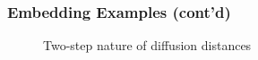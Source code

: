 \documentclass[professionalfonts,hyperref={pdfpagelabels=false,colorlinks=true,linkcolor=red}]{beamer}
\begin{document}
\begin{frame}
\frametitle{Embedding Examples (cont'd)}
  \subfiglabelskip=0pt
  \begin{figure}[htbp]
    \label{fig:logistic}
    \centering
    \hspace{3pt}
    \caption{Two-step nature of diffusion distances}
  \end{figure}

\end{frame}


\begin{frame}

\end{frame}
\end{document}
